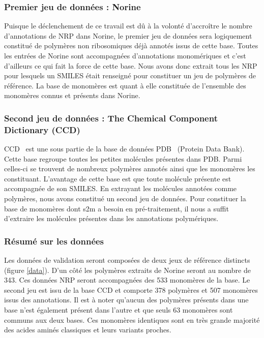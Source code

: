 \subsubsection{Premier jeu de données : Norine}

Puisque le déclenchement de ce travail est dû à la volonté d'accroître le nombre d'annotations de NRP dans Norine, le premier jeu de données sera logiquement constitué de polymères non ribosomiques déjà annotés issus de cette base.
Toutes les entrées de Norine sont accompagnées d'annotations monomériques et c'est d'ailleurs ce qui fait la force de cette base.
Nous avons donc extrait tous les NRP pour lesquels un SMILES était renseigné pour constituer un jeu de polymères de référence.
La base de monomères est quant à elle constituée de l'ensemble des monomères connus et présents dans Norine.


\subsubsection{Second jeu de données : The Chemical Component Dictionary (CCD)}

CCD~\cite{westbrook_chemical_2015} est une sous partie de la base de données PDB~\cite{berman_protein_2000} (Protein Data Bank).
Cette base regroupe toutes les petites molécules présentes dans PDB.
Parmi celles-ci se trouvent de nombreux polymères annotés ainsi que les monomères les constituant.
L'avantage de cette base est que toute molécule présente est accompagnée de son SMILES.
En extrayant les molécules annotées comme polymères, nous avons constitué un second jeu de données.
Pour constituer la base de monomères dont s2m a besoin en pré-traitement, il nous a suffit d'extraire les molécules présentes dans les annotations polymériques.


\subsubsection{Résumé sur les données}

Les données de validation seront composées de deux jeux de référence distincts (figure \ref{data}).
D'un côté les polymères extraits de Norine seront au nombre de 343.
Ces données NRP seront accompagnées des 533 monomères de la base.
Le second jeu est issu de la base CCD et comporte 378 polymères et 507 monomères issus des annotations.
Il est à noter qu'aucun des polymères présents dans une base n'est également présent dans l'autre et que seuls 63 monomères sont communs aux deux bases.
Ces monomères identiques sont en très grande majorité des acides aminés classiques et leurs variants proches.

